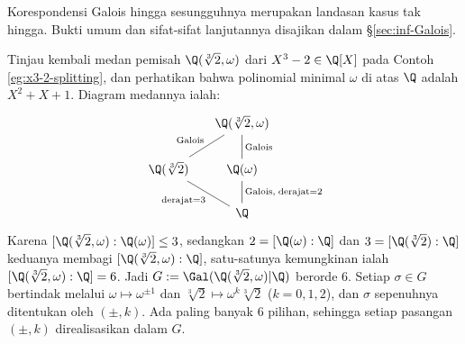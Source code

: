 Korespondensi Galois hingga sesungguhnya merupakan landasan kasus tak hingga. Bukti umum dan sifat-sifat lanjutannya disajikan dalam \S\ref{sec:inf-Galois}.

\begin{example}
	Tinjau kembali medan pemisah $\Q(\sqrt[3]{2},\omega)$ dari $X^3-2\in\Q[X]$ pada Contoh \ref{eg:x3-2-splitting}, dan perhatikan bahwa polinomial minimal $\omega$ di atas $\Q$ adalah $X^2+X+1$. Diagram medannya ialah:
	\[\begin{tikzcd}[column sep=small]
		{} & \Q(\sqrt[3]{2}, \omega) \arrow[dash, d, "\text{Galois}"] \arrow[dash, ld, "\text{Galois}"'] \\
		\Q(\sqrt[3]{2}) \arrow[dash, rd, "\text{derajat} = 3"'] & \Q(\omega) \arrow[dash, d, "{\text{Galois},\; \text{derajat} = 2}"] \\
		& \Q
	\end{tikzcd}\]
	Karena $[\Q(\sqrt[3]{2}, \omega): \Q(\omega)] \leq 3$, sedangkan $2 = [\Q(\omega) : \Q]$ dan $3 = [\Q(\sqrt[3]{2}) : \Q]$ keduanya membagi $[\Q(\sqrt[3]{2}, \omega): \Q]$, satu-satunya kemungkinan ialah $[\Q(\sqrt[3]{2}, \omega): \Q] = 6$. Jadi $G := \Gal(\Q(\sqrt[3]{2},\omega)|\Q)$ berorde $6$. Setiap $\sigma \in G$ bertindak melalui $\omega \mapsto \omega^{\pm 1}$ dan $\sqrt[3]{2} \mapsto \omega^k \sqrt[3]{2}$ ($k=0,1,2$), dan $\sigma$ sepenuhnya ditentukan oleh $(\pm, k)$. Ada paling banyak $6$ pilihan, sehingga setiap pasangan $(\pm,k)$ direalisasikan dalam $G$.


\end{example}
